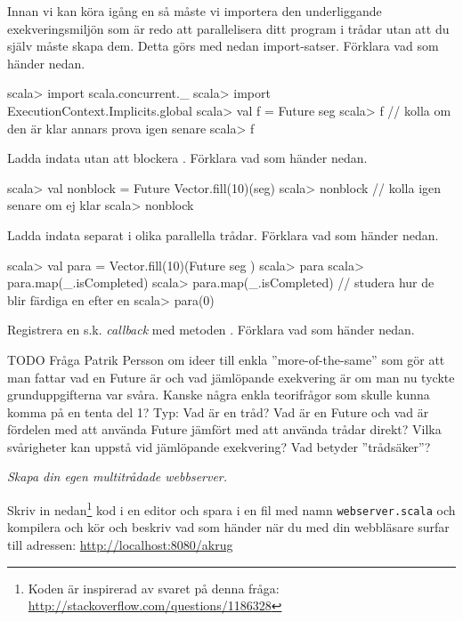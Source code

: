 \Subtask Innan vi kan köra igång en  så måste vi importera den underliggande exekveringsmiljön som är redo att parallelisera ditt program i trådar utan att du själv måste skapa dem. Detta görs med nedan import-satser. Förklara vad som händer nedan.
\begin{REPL}
scala> import scala.concurrent._ 
scala> import ExecutionContext.Implicits.global
scala> val f = Future{ seg }
scala> f   // kolla om den är klar annars prova igen senare
scala> f
\end{REPL}

\Subtask Ladda indata utan att blockera . Förklara vad som händer nedan.
\begin{REPL}
scala> val nonblock = Future{ Vector.fill(10)(seg) }
scala> nonblock   // kolla igen senare om ej klar
scala> nonblock  
\end{REPL}

\Subtask Ladda indata separat i olika parallella trådar. Förklara vad som händer nedan.
\begin{REPL}
scala> val para = Vector.fill(10)(Future{ seg })
scala> para
scala> para.map(_.isCompleted)   
scala> para.map(_.isCompleted) // studera hur de blir färdiga en efter en
scala> para(0)
\end{REPL}

\Subtask Registrera en s.k. \emph{callback} med metoden . Förklara vad som händer nedan.



\ExtraTasks %
  
\Task TODO  Fråga Patrik Persson om ideer till enkla ''more-of-the-same'' som gör att man fattar vad en Future är och vad jämlöpande exekvering är om man nu tyckte grunduppgifterna var svåra. Kanske några enkla teorifrågor som skulle kunna komma på en tenta del 1? Typ: Vad är en tråd? Vad är en Future och vad är fördelen med att använda Future jämfört med att använda trådar direkt? Vilka svårigheter kan uppstå vid jämlöpande exekvering? Vad betyder ''trådsäker''? %

\AdvancedTasks %

\Task \emph{Skapa din egen multitrådade webbserver.} 

\Subtask Skriv in nedan\footnote{Koden är inspirerad av svaret på denna fråga: 
\href{http://stackoverflow.com/questions/1186328/embedded-http-server-in-swing-java-app}{http://stackoverflow.com/questions/1186328}} kod i en editor och spara i en fil med namn \texttt{webserver.scala} och kompilera och kör och beskriv vad som händer när du med din webbläsare surfar till adressen: \url{http://localhost:8080/akrug}

